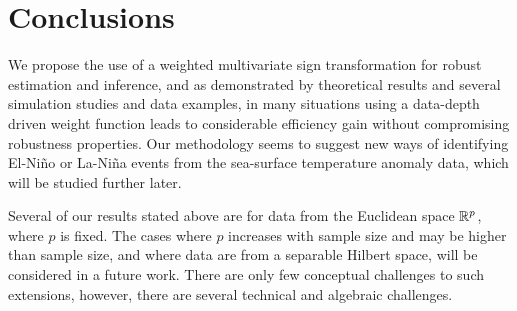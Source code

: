 \section{Conclusions}
\label{Sec:Conclusion}

We propose the use of a weighted multivariate sign transformation for robust 
estimation and inference, and as demonstrated by theoretical results and several 
simulation studies and data examples, in many situations using a data-depth driven weight 
function leads to considerable efficiency gain without compromising robustness 
properties. Our methodology seems to suggest new ways of identifying 
El-Ni\~no or La-Ni\~na events from the sea-surface temperature anomaly data, 
which will be studied further later.

Several of our results stated above are for data from the Euclidean space ${\mathbb{R}}^{p}$, where 
$p$ is fixed. The cases where $p$ increases with sample size and may be higher than sample 
size, and where data are from a separable Hilbert space, will be considered in a future 
work. There are only few conceptual challenges to such extensions, however, there are 
several  technical and algebraic challenges. 

